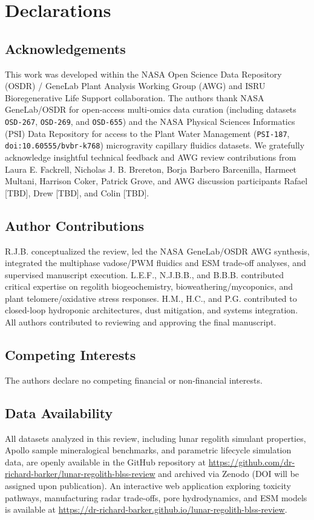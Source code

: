 \section*{Declarations}

\subsection*{Acknowledgements}
This work was developed within the NASA Open Science Data Repository (OSDR) / GeneLab Plant Analysis Working Group (AWG) and ISRU Bioregenerative Life Support collaboration\cite{gebre2025nasa}. The authors thank NASA GeneLab/OSDR for open-access multi-omics data curation (including datasets \texttt{OSD-267}, \texttt{OSD-269}, and \texttt{OSD-655}) and the NASA Physical Sciences Informatics (PSI) Data Repository for access to the Plant Water Management (\texttt{PSI-187}, \texttt{doi:10.60555/bvbr-k768}) microgravity capillary fluidics datasets. We gratefully acknowledge insightful technical feedback and AWG review contributions from Laura E. Fackrell, Nicholas J. B. Brereton, Borja Barbero Barcenilla, Harmeet Multani, Harrison Coker, Patrick Grove, and AWG discussion participants Rafael [TBD], Drew [TBD], and Colin [TBD].

\subsection*{Author Contributions}
R.J.B. conceptualized the review, led the NASA GeneLab/OSDR AWG synthesis, integrated the multiphase vadose/PWM fluidics and ESM trade-off analyses, and supervised manuscript execution. L.E.F., N.J.B.B., and B.B.B. contributed critical expertise on regolith biogeochemistry, bioweathering/mycoponics, and plant telomere/oxidative stress responses. H.M., H.C., and P.G. contributed to closed-loop hydroponic architectures, dust mitigation, and systems integration. All authors contributed to reviewing and approving the final manuscript.

\subsection*{Competing Interests}
The authors declare no competing financial or non-financial interests.

\subsection*{Data Availability}
All datasets analyzed in this review, including lunar regolith simulant properties, Apollo sample mineralogical benchmarks, and parametric lifecycle simulation data, are openly available in the GitHub repository at \url{https://github.com/dr-richard-barker/lunar-regolith-blss-review} and archived via Zenodo (DOI will be assigned upon publication). An interactive web application exploring toxicity pathways, manufacturing radar trade-offs, pore hydrodynamics, and ESM models is available at \url{https://dr-richard-barker.github.io/lunar-regolith-blss-review}.

